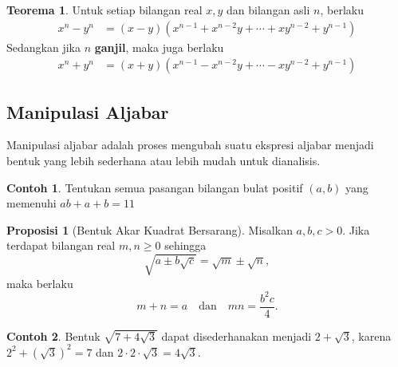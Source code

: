 \documentclass[aspectratio=169]{beamer}
\theoremstyle{definition}
\newtheorem{teorema}{Teorema}
\newtheorem{contoh}{Contoh}
\newtheorem{proposisi}{Proposisi}
\begin{document}
\begin{frame}{\insertsection}{\insertsubsection}
  \begin{teorema}
    Untuk setiap bilangan real $x,y$ dan bilangan asli $n$, berlaku
    \begin{align*}
      x^n - y^n & = (x-y)(x^{n-1} + x^{n-2}y + \cdots + xy^{n-2} + y^{n-1})
    \end{align*}
    Sedangkan jika $n$ \textbf{ganjil}, maka juga berlaku
    \begin{align*}
      x^n + y^n & = (x+y)(x^{n-1} - x^{n-2}y + \cdots - xy^{n-2} + y^{n-1})
    \end{align*}
  \end{teorema}
\end{frame}

\subsection{Manipulasi Aljabar}
\begin{frame}{\insertsection}{\insertsubsection}
  Manipulasi aljabar adalah proses mengubah suatu ekspresi aljabar menjadi bentuk yang lebih sederhana atau lebih mudah untuk dianalisis.
  \begin{contoh}
    Tentukan semua pasangan bilangan bulat positif $(a,b)$ yang memenuhi $ab+a+b=11$
  \end{contoh}
\end{frame}

\begin{frame}{\insertsection}{\insertsubsection}
  \begin{proposisi}[Bentuk Akar Kuadrat Bersarang]
    Misalkan $a,b,c > 0$. Jika terdapat bilangan real $m,n \ge 0$ sehingga
    \[
      \sqrt{a \pm b\sqrt{c}} = \sqrt{m} \pm \sqrt{n},
    \]
    maka berlaku
    \[
      m+n = a
      \quad \text{dan} \quad
      mn = \frac{b^2 c}{4}.
    \]
  \end{proposisi}
  \begin{contoh}
    Bentuk $\sqrt{7 + 4\sqrt{3}}$ dapat disederhanakan menjadi $2 + \sqrt{3}$, karena $2^2 + (\sqrt{3})^2 = 7$ dan $2 \cdot 2 \cdot \sqrt{3} = 4\sqrt{3}$.
  \end{contoh}
\end{frame}
\end{document}

